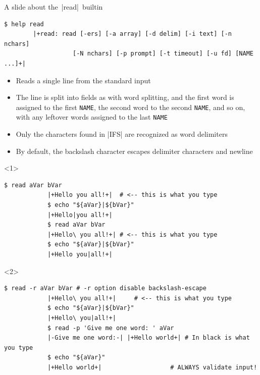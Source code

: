 \begin{frame}[fragile]{A slide about the \,\bash|read|\, builtin}
    \vspace{-2mm}
    \begin{lstlisting}[style=MyBash, numbers=none, belowskip=-7mm, style=smaller]
        $ help read
        |+read: read [-ers] [-a array] [-d delim] [-i text] [-n nchars]
                   [-N nchars] [-p prompt] [-t timeout] [-u fd] [NAME ...]+|
    \end{lstlisting}
    \begin{itemize}
        \item Reads a single line from the standard input
        \item The line is split into fields as with word splitting, and the first word is assigned to the first \texttt{NAME}, the second word to the second \texttt{NAME}, and so on, with any leftover words assigned to the last \texttt{NAME}
        \item \alert{Only the characters found in \bash|IFS| are recognized as word delimiters}
        \item By default, the backslash character escapes delimiter characters and newline
    \end{itemize}
    \begin{onlyenv}<1>
        \begin{lstlisting}[style=MyBash, aboveskip=2mm, style=oddnumbers]
            $ read aVar bVar
            |+Hello you all!+|  # <-- this is what you type
            $ echo "${aVar}|${bVar}"
            |+Hello|you all!+|
            $ read aVar bVar
            |+Hello\ you all!+| # <-- this is what you type
            $ echo "${aVar}|${bVar}"
            |+Hello you|all!+|
        \end{lstlisting}
    \end{onlyenv}
    \begin{onlyenv}<2>
        \begin{lstlisting}[style=MyBash, aboveskip=2mm, style=oddnumbers, firstnumber=8]
            $ read -r aVar bVar # -r option disable backslash-escape
            |+Hello\ you all!+|     # <-- this is what you type
            $ echo "${aVar}|${bVar}"
            |+Hello\ you|all!+|
            $ read -p 'Give me one word: ' aVar
            |-Give me one word:-| |+Hello world+| # In black is what you type
            $ echo "${aVar}"
            |+Hello world+|                   # ALWAYS validate input!
        \end{lstlisting}
    \end{onlyenv}
\end{frame}



